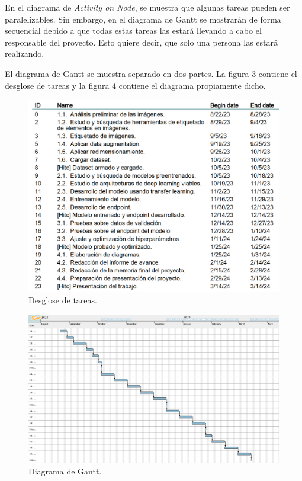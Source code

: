 \documentclass[
11pt, %
codirector, %
]{charter}
\begin{document}
En el diagrama de \textit{Activity on Node}, se muestra que algunas tareas pueden ser paralelizables. Sin embargo, en el diagrama de Gantt se mostrarán de forma secuencial debido a que todas estas tareas las estará llevando a cabo el responsable del proyecto. Esto quiere decir, que solo una persona las estará realizando.

El diagrama de Gantt se muestra separado en dos partes. La figura 3 contiene el desglose de tareas y la figura 4 contiene el diagrama propiamente dicho.

\begin{figure}[htpb]
\centering 
\includegraphics[width=.8\textwidth]{./Figuras/TableG3.png}
\caption{Desglose de tareas.}
\label{fig:diagBloques}
\end{figure}


\begin{landscape}
\begin{figure}[htpb]
\centering 
\includegraphics[height=.85\textheight]{./Figuras/Gantt.png}
\caption{Diagrama de Gantt.}
\label{fig:diagGantt}
\end{figure}

\end{landscape}
\end{document}
